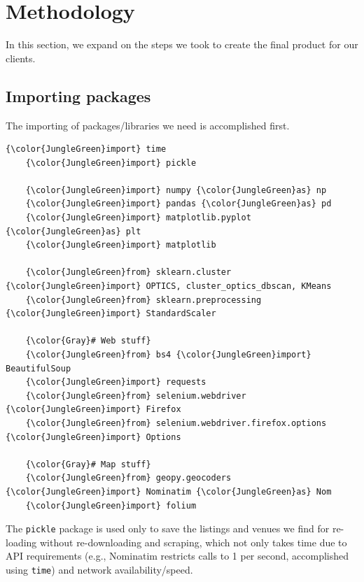 \documentclass{article}
\begin{document}
\section{Methodology}
In this section, we expand on the steps we took to create the final product for our clients. 

\subsection{Importing packages}
The importing of packages/libraries we need is accomplished first. 
\begin{Verbatim}[commandchars=\\\{\}]
    {\color{JungleGreen}import} time
    {\color{JungleGreen}import} pickle

    {\color{JungleGreen}import} numpy {\color{JungleGreen}as} np
    {\color{JungleGreen}import} pandas {\color{JungleGreen}as} pd
    {\color{JungleGreen}import} matplotlib.pyplot {\color{JungleGreen}as} plt
    {\color{JungleGreen}import} matplotlib

    {\color{JungleGreen}from} sklearn.cluster {\color{JungleGreen}import} OPTICS, cluster_optics_dbscan, KMeans
    {\color{JungleGreen}from} sklearn.preprocessing {\color{JungleGreen}import} StandardScaler

    {\color{Gray}# Web stuff}
    {\color{JungleGreen}from} bs4 {\color{JungleGreen}import} BeautifulSoup
    {\color{JungleGreen}import} requests
    {\color{JungleGreen}from} selenium.webdriver {\color{JungleGreen}import} Firefox
    {\color{JungleGreen}from} selenium.webdriver.firefox.options {\color{JungleGreen}import} Options

    {\color{Gray}# Map stuff}
    {\color{JungleGreen}from} geopy.geocoders {\color{JungleGreen}import} Nominatim {\color{JungleGreen}as} Nom
    {\color{JungleGreen}import} folium
\end{Verbatim}
The {\tt pickle} package is used only to save the listings and venues we find for re-loading without re-downloading and scraping, which not only takes time due to API requirements (e.g., Nominatim restricts calls to 1 per second, accomplished using {\tt time}) and network availability/speed. 
\end{document}
